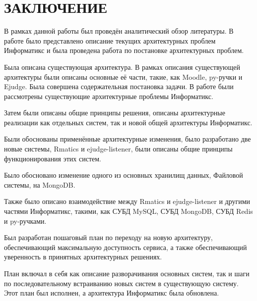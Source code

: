 \chapter{\MakeUppercase{Заключение}}

В рамках данной работы был проведён аналитический обзор литературы.
В работе было представлено описание текущих архитектурных проблем Информатикс и
была проведена работа по постановке архитектурных проблем.

Была описана существующая архитектура. 
В рамках описания существующей архитектуры были описаны основные её части, такие, как Moodle, py-ручки и Ejudge.
Была совершена содержательная постановка задачи. 
В работе были рассмотрены существующие архитектурные проблемы Информатикс.

Затем были описаны общие принципы решения, 
описаны архитектурные реализации как отдельных систем, так и новой общей архитектуры Информатикс.

Были обоснованы применённые архитектурные изменения, 
было разработано две новые системы, Rmatics и ejudge-listener,
были описаны общие принципы функционирования этих систем.

Было обосновано изменение одного из основных хранилищ данных, Файловой системы, на MongoDB.

Также было описано взаимодействие между Rmatics и ejudge-listener 
и другими частями Информатикс,
такими, как СУБД MySQL, СУБД MongoDB, СУБД Redis и py-ручками.

Был разработан пошаговый план по переходу на новую архитектуру,
обеспечивающий максимальную доступность сервиса, 
а также обеспечивающий уверенность в принятных архитектурных решениях.

План включал в себя как описание разворачивания основных систем, 
так и шаги по последовательному встраиванию новых систем в существующую систему.
Этот план был исполнен, а архитектура Информатикс была обновлена.
